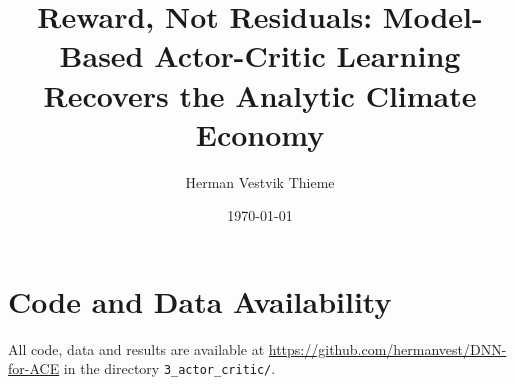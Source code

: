 \documentclass[11pt]{article}
\title{Reward, Not Residuals: Model-Based Actor-Critic Learning\\ Recovers the Analytic Climate Economy}
\author{Herman Vestvik Thieme}
\date{\today}
\begin{document}
\maketitle

\begin{abstract}

\end{abstract}










\section*{Code and Data Availability}
All code, data and results are available at \url{https://github.com/hermanvest/DNN-for-ACE} in the directory \texttt{3\_actor\_critic/}.

\printbibliography
\end{document}

